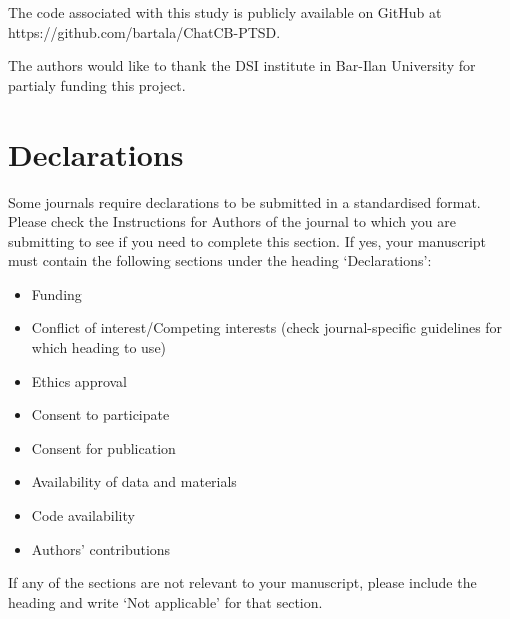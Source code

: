 \documentclass[bst/sn-nature]{sn-jnl}%
\theoremstyle{thmstyleone}%
\theoremstyle{thmstyletwo}%
\theoremstyle{thmstylethree}%
\begin{document}
\backmatter

The code associated with this study is publicly available on GitHub at https://github.com/bartala/ChatCB-PTSD.

The authors would like to thank the DSI institute in Bar-Ilan University for partialy funding this project.

\section{Declarations}

Some journals require declarations to be submitted in a standardised format. Please check the Instructions for Authors of the journal to which you are submitting to see if you need to complete this section. If yes, your manuscript must contain the following sections under the heading `Declarations':

\begin{itemize}
\item Funding
\item Conflict of interest/Competing interests (check journal-specific guidelines for which heading to use)
\item Ethics approval 
\item Consent to participate
\item Consent for publication
\item Availability of data and materials
\item Code availability 
\item Authors' contributions
\end{itemize}

\noindent
If any of the sections are not relevant to your manuscript, please include the heading and write `Not applicable' for that section. 
\end{document}
